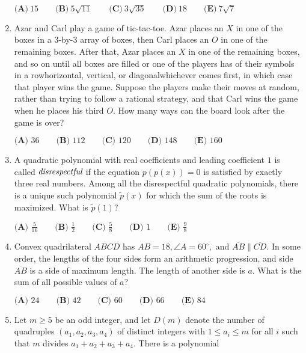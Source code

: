 \documentclass{article}
\begin{document}
\begin{enumerate}[label=\arabic*., itemsep=0.5em]
$\textbf{(A)}\: 15\qquad\textbf{(B)} \: 5\sqrt{11}\qquad\textbf{(C)} \: 3\sqrt{35}\qquad\textbf{(D)} \: 18\qquad\textbf{(E)} \: 7\sqrt{7}$\par \vspace{0.5em}\item Azar and Carl play a game of tic-tac-toe. Azar places an $X$ in one of the boxes in a $3$-by-$3$ array of boxes, then Carl places an $O$ in one of the remaining boxes. After that, Azar places an $X$ in one of the remaining boxes, and so on until all boxes are filled or one of the players has of their symbols in a rowhorizontal, vertical, or diagonalwhichever comes first, in which case that player wins the game. Suppose the players make their moves at random, rather than trying to follow a rational strategy, and that Carl wins the game when he places his third $O$. How many ways can the board look after the game is over?

$\textbf{(A) } 36 \qquad\textbf{(B) } 112 \qquad\textbf{(C) } 120 \qquad\textbf{(D) } 148 \qquad\textbf{(E) } 160$\par \vspace{0.5em}\item A quadratic polynomial with real coefficients and leading coefficient $1$ is called $\emph{disrespectful}$ if the equation $p(p(x))=0$ is satisfied by exactly three real numbers. Among all the disrespectful quadratic polynomials, there is a unique such polynomial $\tilde{p}(x)$ for which the sum of the roots is maximized. What is $\tilde{p}(1)$?

$\textbf{(A) } \frac{5}{16} \qquad\textbf{(B) } \frac{1}{2} \qquad\textbf{(C) } \frac{5}{8} \qquad\textbf{(D) } 1 \qquad\textbf{(E) } \frac{9}{8}$\par \vspace{0.5em}\item Convex quadrilateral $ABCD$ has $AB = 18, \angle{A} = 60^\circ,$ and $\overline{AB} \parallel \overline{CD}.$ In some order, the lengths of the four sides form an arithmetic progression, and side $\overline{AB}$ is a side of maximum length. The length of another side is $a.$ What is the sum of all possible values of $a$?

$\textbf{(A) } 24 \qquad \textbf{(B) } 42 \qquad \textbf{(C) } 60 \qquad \textbf{(D) } 66 \qquad \textbf{(E) } 84$\par \vspace{0.5em}\item Let $m\ge 5$ be an odd integer, and let $D(m)$ denote the number of quadruples $(a_1, a_2, a_3, a_4)$ of distinct integers with $1\le a_i \le m$ for all $i$ such that $m$ divides $a_1+a_2+a_3+a_4$. There is a polynomial


\end{enumerate}
\end{document}
